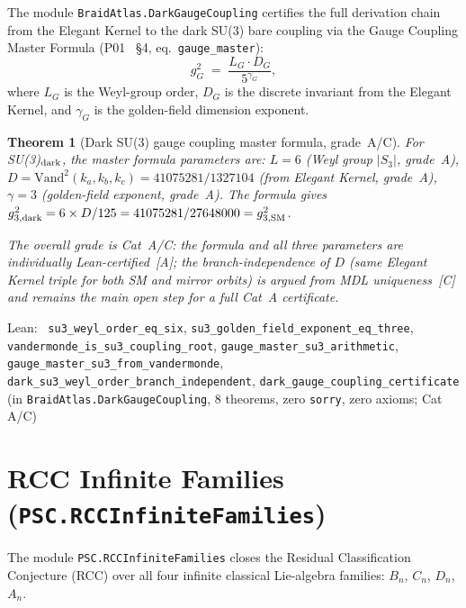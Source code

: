 \documentclass[11pt,a4paper]{article}
\newenvironment{leanref}%
  {\par\smallskip\noindent\begingroup\raggedright\textup{Lean:}~}%
  {\par\endgroup}
\newtheorem{theorem}{Theorem}[section]
\theoremstyle{definition}
\begin{document}
The module \texttt{BraidAtlas.DarkGaugeCoupling} certifies the full derivation chain
from the Elegant Kernel to the dark SU(3) bare coupling via the Gauge Coupling Master
Formula (P01~\cite{SpivackSMFromUGP} \S4, eq.~\texttt{gauge\_master}):
\[
  g_G^2 \;=\; \frac{L_G \cdot D_G}{5^{\gamma_G}},
\]
where $L_G$ is the Weyl-group order, $D_G$ is the discrete invariant from the Elegant
Kernel, and $\gamma_G$ is the golden-field dimension exponent.

\begin{theorem}[Dark SU(3) gauge coupling master formula, grade~A/C]
\label{thm:dark_su3_coupling_master}
For SU(3)$_{\rm dark}$, the master formula parameters are:
$L = 6$ (Weyl group $|S_3|$, grade~A),
$D = \mathrm{Vand}^2(k_a,k_b,k_c) = 41075281/1327104$ (from Elegant Kernel, grade~A),
$\gamma = 3$ (golden-field exponent, grade~A).
The formula gives $g_{3,{\rm dark}}^2 = 6\times D / 125 = 41075281/27648000 = g_{3,{\rm SM}}^2$.

The overall grade is Cat~A/C: the formula and all three parameters are individually
Lean-certified~[A]; the branch-independence of $D$ (same Elegant Kernel triple for both
SM and mirror orbits) is argued from MDL uniqueness~[C] and remains the main open step
for a full Cat~A certificate.
\end{theorem}

\begin{leanref}
\lstinline|su3_weyl_order_eq_six|,
\lstinline|su3_golden_field_exponent_eq_three|,
\lstinline|vandermonde_is_su3_coupling_root|,
\lstinline|gauge_master_su3_arithmetic|,
\lstinline|gauge_master_su3_from_vandermonde|,
\lstinline|dark_su3_weyl_order_branch_independent|,
\lstinline|dark_gauge_coupling_certificate|
\textup{(in \texttt{BraidAtlas.DarkGaugeCoupling}, 8 theorems, zero \texttt{sorry},
zero axioms; Cat A/C)}
\end{leanref}

\section{RCC Infinite Families (\texttt{PSC.RCCInfiniteFamilies})}
\label{sec:rcc_infinite}

The module \texttt{PSC.RCCInfiniteFamilies}
closes the Residual Classification Conjecture (RCC) over all four infinite classical
Lie-algebra families: $B_n$, $C_n$, $D_n$, $A_n$.
\end{document}
